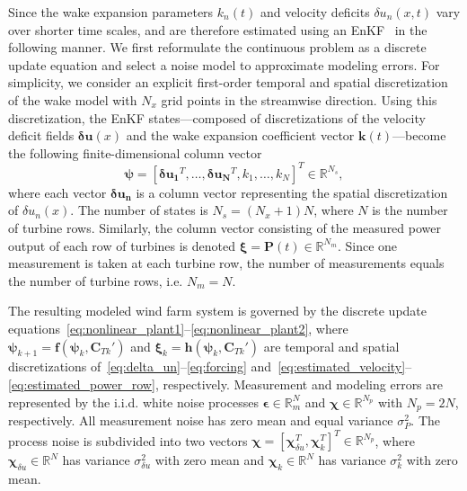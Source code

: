 Since the wake expansion parameters $k_n(t)$ and velocity deficits $\delta u_n(x,t)$ vary over shorter time scales, and are therefore estimated using an EnKF~\cite{Evensen2003a} in the following manner. We first reformulate the continuous problem as a discrete update equation and select a noise model to approximate modeling errors. For simplicity, we consider an explicit first-order temporal and spatial discretization of the wake model with $N_x$ grid points in the streamwise direction. Using this discretization, the EnKF states---composed of discretizations of the velocity deficit fields $\boldsymbol \delta \mathbf{u}(x)$ and the wake expansion coefficient vector $\mathbf{k}(t)$---become the following finite-dimensional column vector
\begin{equation}
\boldsymbol \psi = \left[ \boldsymbol \delta \mathbf{u_1}^T,\hdots, \boldsymbol \delta \mathbf{u_N}^T, k_1, \hdots, k_N \right]^T \in \mathbb{R}^{N_s}, 
\end{equation}
where each vector $\boldsymbol \delta \mathbf{u_n}$ is a column vector representing the spatial discretization of $\delta u_n(x)$. 
The number of states is $N_s = (N_x+1)N$, where $N$ is the number of turbine rows. Similarly, the column vector consisting of the measured power output of each row of turbines is denoted $\boldsymbol \xi = \mathbf{P}(t) \in \mathbb{R}^{N_m}$. Since one measurement is taken at each turbine row, the number of measurements equals the number of turbine rows, i.e. $N_m = N$.

The resulting modeled wind farm system is governed by the discrete update equations~\eqref{eq:nonlinear_plant1}--\eqref{eq:nonlinear_plant2}, where $\boldsymbol \psi_{k+1} = \mathbf{f}( \boldsymbol \psi_k, \mathbf{C}_{Tk}')$ and $ \boldsymbol \xi_k = \mathbf{h}(\boldsymbol \psi_k, \mathbf{C}_{Tk}')$ are temporal and spatial discretizations of~\eqref{eq:delta_un}--\eqref{eq:forcing} and~\eqref{eq:estimated_velocity}--\eqref{eq:estimated_power_row}, respectively. Measurement and modeling errors are represented by the i.i.d. white noise processes $\boldsymbol \epsilon \in \mathbb{R}^N_m$ and $\boldsymbol \chi \in \mathbb{R}^{N_p}$ with $N_p = 2N$, respectively. All measurement noise has zero mean and equal variance $\sigma_P^2$. The process noise is subdivided into two vectors $\boldsymbol \chi = [\boldsymbol \chi_{\delta u}^T, \boldsymbol \chi_k^T]^T \in \mathbb{R}^{N_p}$, where $\boldsymbol \chi_{\delta u} \in \mathbb{R}^N$ has variance $\sigma_{\delta u}^2$  with zero mean and $\boldsymbol \chi_k \in \mathbb{R}^N$ has variance $\sigma_{k}^2$ with zero mean.

